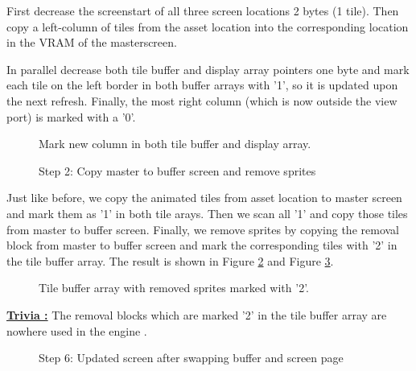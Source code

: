 \documentclass[book.tex]{subfiles}
\begin{document}
First decrease the screenstart of all three screen locations 2 bytes (1 tile). Then copy a left-column of tiles from the asset location into the corresponding location in the VRAM of the masterscreen.\\
\par
In parallel decrease both tile buffer and display array pointers one byte and mark each tile on the left border in both buffer arrays with '1', so it is updated upon the next refresh.
Finally, the most right column (which is now outside the view port) is marked with a '0'.

\begin{figure}[H]
\centering
 \caption{Mark new column in both tile buffer and display array.}
 \label{fig:kc4_6_tile_final}
\end{figure}


\begin{figure}[H]
\centering
 \caption{Step 2: Copy master to buffer screen and remove sprites}
 \label{fig:kc4_6_update_buffer}
\end{figure}



Just like before, we copy the animated tiles from asset location to master screen and mark them as '1' in both tile arays. Then we scan all '1' and copy those tiles from master to buffer screen. Finally, we remove sprites by copying the removal block from master to buffer screen and mark the corresponding tiles with '2' in the tile buffer array. The result is shown in Figure \ref{fig:kc4_6_update_buffer} and Figure \ref{fig:kc4_6_update_array}.

\begin{figure}[H]
\centering
 \caption{Tile buffer array with removed sprites marked with '2'.}
 \label{fig:kc4_6_update_array}
\end{figure}

\par
\textbf{\underline{Trivia :}} The removal blocks which are marked '2' in the tile buffer array are nowhere used in the engine .\\
  \par
\pagebreak

\begin{figure}[H]
\centering
 \caption{Step 6: Updated screen after swapping buffer and screen page}
 \label{fig:k4_6_update_final}
\end{figure}
\end{document}
